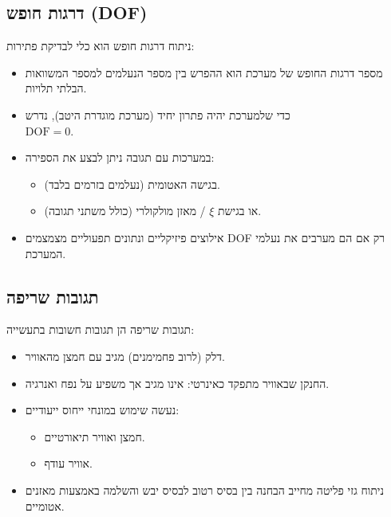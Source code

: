\documentclass[
  hebrew,
  letterpaper,
  DIV=11,
  numbers=noendperiod]{scrreprt}
\providecommand{\tightlist}{%
  \setlength{\itemsep}{0pt}\setlength{\parskip}{0pt}}
\begin{document}
\subsection{דרגות חופש
(DOF)}\label{ux5d3ux5e8ux5d2ux5d5ux5ea-ux5d7ux5d5ux5e4ux5e9-dof}

ניתוח דרגות חופש הוא כלי לבדיקת פתירות:

\begin{itemize}
\tightlist
\item
  מספר דרגות החופש של מערכת הוא ההפרש בין מספר הנעלמים למספר המשוואות
  הבלתי תלויות.
\item
  כדי שלמערכת יהיה פתרון יחיד (מערכת מוגדרת היטב), נדרש\\
  \(\mathrm{DOF}=0\).
\item
  במערכות עם תגובה ניתן לבצע את הספירה:

  \begin{itemize}
  \tightlist
  \item
    בגישה האטומית (נעלמים בזרמים בלבד).
  \item
    או בגישת \(\xi\) / מאזן מולקולרי (כולל משתני תגובה).
  \end{itemize}
\item
  אילוצים פיזיקליים ונתונים תפעוליים מצמצמים DOF רק אם הם מערבים את
  נעלמי המערכת.
\end{itemize}

\subsection{תגובות
שריפה}\label{ux5eaux5d2ux5d5ux5d1ux5d5ux5ea-ux5e9ux5e8ux5d9ux5e4ux5d4-1}

תגובות שריפה הן תגובות חשובות בתעשייה:

\begin{itemize}
\tightlist
\item
  דלק (לרוב פחמימנים) מגיב עם חמצן מהאוויר.
\item
  החנקן שבאוויר מתפקד כאינרטי: אינו מגיב אך משפיע על נפח ואנרגיה.
\item
  נעשה שימוש במונחי ייחוס ייעודיים:

  \begin{itemize}
  \tightlist
  \item
    חמצן ואוויר תיאורטיים.
  \item
    אוויר עודף.
  \end{itemize}
\item
  ניתוח גזי פליטה מחייב הבחנה בין בסיס רטוב לבסיס יבש והשלמה באמצעות
  מאזנים אטומיים.
\end{itemize}
\end{document}
